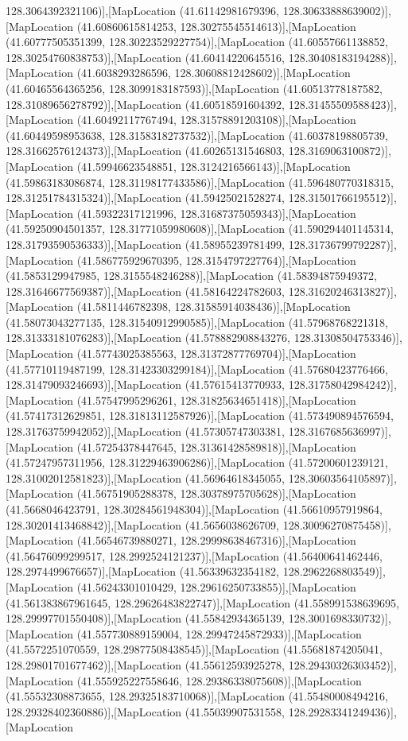 128.3064392321106)],[MapLocation (41.61142981679396, 128.30633888639002)],[MapLocation (41.60860615814253, 128.30275545514613)],[MapLocation (41.60777505351399, 128.30223529227754)],[MapLocation (41.60557661138852, 128.30254760838753)],[MapLocation (41.60414220645516, 128.30408183194288)],[MapLocation (41.6038293286596, 128.30608812428602)],[MapLocation (41.60465564365256, 128.3099183187593)],[MapLocation (41.60513778187582, 128.31089656278792)],[MapLocation (41.60518591604392, 128.31455509588423)],[MapLocation (41.60492117767494, 128.31578891203108)],[MapLocation (41.60449598953638, 128.31583182737532)],[MapLocation (41.60378198805739, 128.31662576124373)],[MapLocation (41.60265131546803, 128.3169063100872)],[MapLocation (41.59946623548851, 128.3124216566143)],[MapLocation (41.59863183086874, 128.31198177433586)],[MapLocation (41.596480770318315, 128.31251784315324)],[MapLocation (41.59425021528274, 128.31501766195512)],[MapLocation (41.59322317121996, 128.31687375059343)],[MapLocation (41.59250904501357, 128.31771059980608)],[MapLocation (41.590294401145314, 128.31793590536333)],[MapLocation (41.58955239781499, 128.31736799792287)],[MapLocation (41.586775929670395, 128.3154797227764)],[MapLocation (41.5853129947985, 128.3155548246288)],[MapLocation (41.58394875949372, 128.31646677569387)],[MapLocation (41.58164224782603, 128.31620246313827)],[MapLocation (41.5811446782398, 128.31585914038436)],[MapLocation (41.58073043277135, 128.31540912990585)],[MapLocation (41.57968768221318, 128.31333181076283)],[MapLocation (41.578882908843276, 128.31308504753346)],[MapLocation (41.57743025385563, 128.31372877769704)],[MapLocation (41.57710119487199, 128.31423303299184)],[MapLocation (41.57680423776466, 128.31479093246693)],[MapLocation (41.57615413770933, 128.31758042984242)],[MapLocation (41.57547995296261, 128.31825634651418)],[MapLocation (41.57417312629851, 128.31813112587926)],[MapLocation (41.573490894576594, 128.31763759942052)],[MapLocation (41.57305747303381, 128.3167685636997)],[MapLocation (41.57254378447645, 128.31361428589818)],[MapLocation (41.57247957311956, 128.31229463906286)],[MapLocation (41.57200601239121, 128.31002012581823)],[MapLocation (41.56964618345055, 128.30603564105897)],[MapLocation (41.56751905288378, 128.30378975705628)],[MapLocation (41.5668046423791, 128.30284561948304)],[MapLocation (41.56610957919864, 128.30201413468842)],[MapLocation (41.5656038626709, 128.30096270875458)],[MapLocation (41.56546739880271, 128.29998638467316)],[MapLocation (41.56476099299517, 128.2992524121237)],[MapLocation (41.56400641462446, 128.2974499676657)],[MapLocation (41.56339632354182, 128.2962268803549)],[MapLocation (41.56243301010429, 128.29616250733855)],[MapLocation (41.561383867961645, 128.29626483822747)],[MapLocation (41.558991538639695, 128.29997701550408)],[MapLocation (41.55842934365139, 128.3001698330732)],[MapLocation (41.557730889159004, 128.29947245872933)],[MapLocation (41.5572251070559, 128.29877508438545)],[MapLocation (41.55681874205041, 128.29801701677462)],[MapLocation (41.55612593925278, 128.29430326303452)],[MapLocation (41.555925227558646, 128.29386338075608)],[MapLocation (41.55532308873655, 128.29325183710068)],[MapLocation (41.55480008494216, 128.29328402360886)],[MapLocation (41.55039907531558, 128.29283341249436)],[MapLocation 